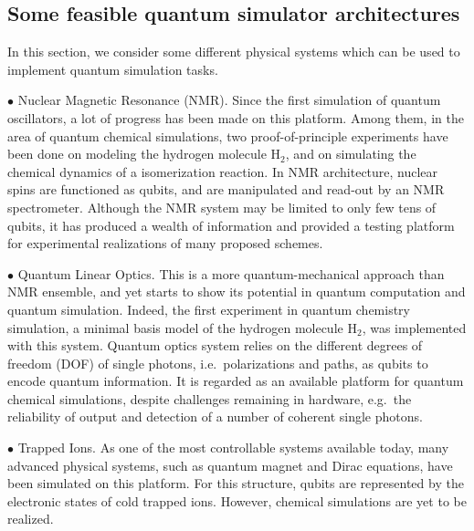 \documentclass[8.5pt,twoside,twocolumn]{article}
\begin{document}
\subsection{Some feasible quantum simulator architectures}

In this section, we consider some different physical systems which can be used to implement quantum simulation tasks. \cite{Nature_Rev, Rep_Rev}

$\bullet$ Nuclear Magnetic Resonance (NMR).
Since the first simulation
of quantum oscillators,\cite{NMR_oscillator}
a lot of progress has been made on this
platform.\cite{NMR_1,NMR_2,NMR_3,NMR_4,NMR_5}
Among them, in the area of quantum chemical simulations,
two proof-of-principle experiments have been done
on modeling the hydrogen molecule
H$_{2}$,\cite{NMR_static} and on simulating the
chemical dynamics of a isomerization reaction.\cite{NMR_dynamic}
In NMR architecture, nuclear spins are functioned as qubits,
and are manipulated and read-out
by an NMR spectrometer.\cite{NMR_readout}
Although the NMR system may be
limited to only few tens of qubits,
it has produced a wealth of information
and provided a testing platform
for experimental realizations of many
proposed schemes.\cite{NMR_review_1,NMR_review_2}

$\bullet$ Quantum Linear Optics. This is a more
quantum-mechanical approach than NMR ensemble,
and yet starts to show its potential in quantum computation
and quantum simulation.\cite{Optics_review_1} Indeed,
the first experiment in quantum chemistry simulation,
a minimal basis model of the hydrogen molecule H$_{2}$,
was implemented with this system.\cite{Optics_static}
Quantum optics system relies on the different degrees of freedom (DOF)
of single photons, i.e.\ polarizations and paths,
as qubits to encode quantum
information.\cite{Optics_review_1,Optics_review_2}
It is regarded as an available platform for
quantum chemical simulations, despite challenges remaining in
hardware, e.g.\ the reliability of output and detection
of a number of coherent single photons.\cite{Optics_first}

$\bullet$ Trapped Ions. As one of the most controllable systems
available today, many advanced physical systems,
such as quantum magnet and Dirac equations,
have been simulated on this
platform.\cite{Qubits,Ions_expt_2,Ions_expt_3}
For this structure, qubits are represented by the electronic states
of cold trapped ions.\cite{Ions_review_1,Ions_review_2,Ions_review_3}
However, chemical simulations are yet to be realized.
\end{document}
